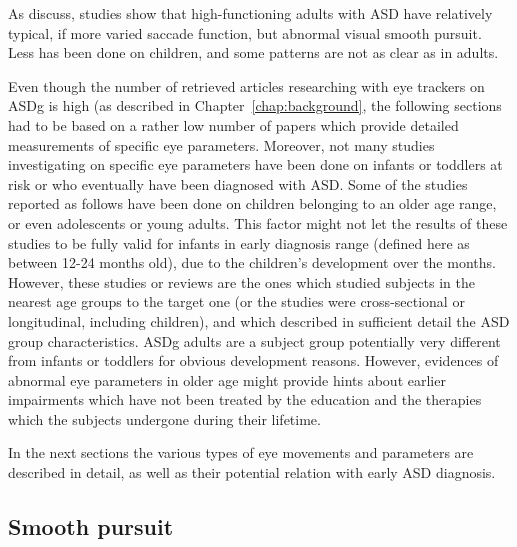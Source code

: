 As \cite{wilkes2015oculomotor} discuss, studies show that high-functioning adults with ASD have relatively typical, if more varied saccade function, but abnormal visual smooth pursuit. Less has been done on children, and some patterns are not as clear as in adults.

Even though the number of retrieved articles researching with eye trackers on ASDg is high (as described in Chapter~\ref{chap:background}, the following sections had to be based on a rather low number of papers which provide detailed measurements of specific eye parameters. Moreover, not many studies investigating on specific eye parameters have been done on infants or toddlers at risk or who eventually have been diagnosed with ASD. Some of the studies reported as follows have been done on children belonging to an older age range, or even adolescents or young adults. This factor might not let the results of these studies to be fully valid for infants in early diagnosis range (defined here as between 12-24 months old), due to the children’s development over the months. However, these studies or reviews are the ones which studied subjects in the nearest age groups to the target one (or the studies were cross-sectional or longitudinal, including children), and which described in sufficient detail the ASD group characteristics. ASDg adults are a subject group potentially very different from infants or toddlers for obvious development reasons. However, evidences of abnormal eye parameters in older age might provide hints about earlier impairments which have not been treated by the education and the therapies which the subjects undergone during their lifetime.

In the next sections the various types of eye movements and parameters are described in detail, as well as their potential relation with early ASD diagnosis.



\subsection{Smooth pursuit}
\label{sec:smoothpursuittheory}

